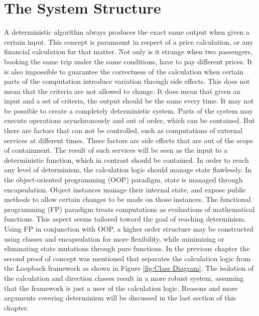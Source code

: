 \section{The System Structure}
A deterministic algorithm always produces the exact same output when given a certain input. This concept is paramount in respect of a price calculation, or any financial calculation for that matter. Not only is it strange when two passengers, booking the same trip under the same conditions, have to pay different prices. It is also impossible to guarantee the correctness of the calculation when certain parts of the computation introduce variation through side effects. This does not mean that the criteria are not allowed to change. It does mean that given an input and a set of criteria, the output should be the same every time. It may not be possible to create a completely deterministic system. Parts of the system may execute operations asynchronously and out of order, which can be contained. But there are factors that can not be controlled, such as computations of external services at different times. These factors are side effects that are out of the scope of containment. The result of such services will be seen as the input to a deterministic function, which in contrast should be contained. In order to reach any level of determinism, the calculation logic should manage state flawlessly. In the object-oriented programming (OOP) paradigm, state is managed through encapsulation. Object instances manage their internal state, and expose public methods to allow certain changes to be made on those instances. The functional programming (FP) paradigm treats computations as evaluations of mathematical functions. This aspect seems tailored toward the goal of reaching determinism. Using FP in conjunction with OOP, a higher order structure may be constructed using classes and encapsulation for more flexibility, while minimizing or eliminating state mutations through pure functions. In the previous chapter the second proof of concept was mentioned that separates the calculation logic from the Loopback framework as shown in Figure \ref{fig:Class Diagram}. The isolation of the calculation and direction classes result in a more robust system, assuming that the framework is just a user of the calculation logic. Reasons and more arguments covering determinism will be discussed in the last section of this chapter.

